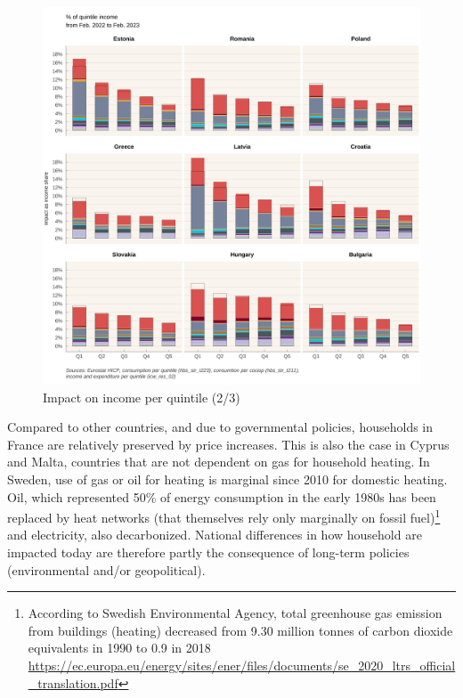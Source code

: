\documentclass[
  9pt,
  a4paper,
  numbers=noendperiod,
  DIV=12]{scrartcl}
\begin{document}
\begin{figure}[htb]

\caption{\label{fig-impact3}Impact on income per quintile (2/3)}

{\centering \includegraphics[width=1\textwidth,height=\textheight]{SIWU_brief_files/figure-pdf/fig-impact3-1.png}

}

\end{figure}

\FloatBarrier

Compared to other countries, and due to governmental policies,
households in France are relatively preserved by price increases. This
is also the case in Cyprus and Malta, countries that are not dependent
on gas for household heating. In Sweden, use of gas or oil for heating
is marginal since 2010 for domestic heating. Oil, which represented 50\%
of energy consumption in the early 1980s has been replaced by heat
networks (that themselves rely only marginally on fossil
fuel)\footnote{According to Swedish Environmental Agency, total
  greenhouse gas emission from buildings (heating) decreased from 9.30
  million tonnes of carbon dioxide equivalents in 1990 to 0.9 in 2018
  \url{https://ec.europa.eu/energy/sites/ener/files/documents/se_2020_ltrs_official_translation.pdf}}
and electricity, also decarbonized. National differences in how
household are impacted today are therefore partly the consequence of
long-term policies (environmental and/or geopolitical).
\end{document}
